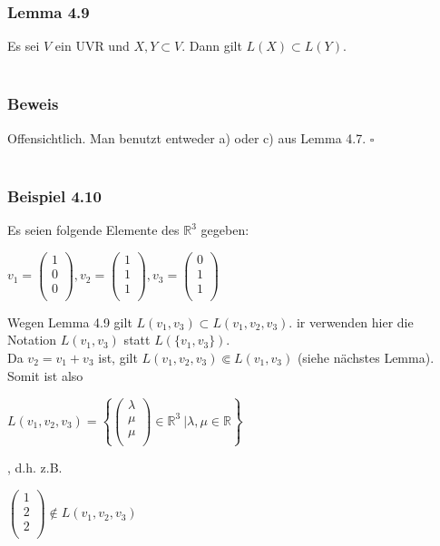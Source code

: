 \documentclass{article}
\begin{document}
\subsubsection*{Lemma 4.9}
Es sei $V$ ein UVR und $X, Y \subset V$. Dann gilt $L(X) \subset L(Y)$.\\
\\
\subsubsection*{Beweis}
Offensichtlich. Man benutzt entweder a) oder c) aus Lemma 4.7. $\square$ \\
\\
\subsubsection*{Beispiel 4.10}
Es seien folgende Elemente des $\mathbb{R}^3$ gegeben: \\
\begin{center}
    $v_1 = \begin{pmatrix}
        1 \\
        0 \\
        0 \\
    \end{pmatrix}, v_2 = \begin{pmatrix}
        1 \\
        1 \\
        1 \\
    \end{pmatrix}, v_3 = \begin{pmatrix}
        0 \\
        1 \\
        1 \\
    \end{pmatrix}$ \\
\end{center}
Wegen Lemma 4.9 gilt $L(v_1, v_3) \subset L(v_1, v_2, v_3)$. ir verwenden hier die Notation $L(v_1, v_3)$ statt $L(\{v_1, v_3\})$. \\
Da $v_2 = v_1 + v_3$ ist, gilt $L(v_1, v_2, v_3) \Subset L(v_1, v_3)$ (siehe nächstes Lemma). \\
Somit ist also \\
\begin{center}
    $L(v_1, v_2, v_3) = \left\{ \begin{pmatrix}
        \lambda \\
        \mu \\
        \mu \\
    \end{pmatrix} \in \mathbb{R}^3 \ | \lambda, \mu \in \mathbb{R}  \right\}$ \\
\end{center}
, d.h. z.B. \\
\begin{center}
    $\begin{pmatrix}
        1 \\
        2 \\
        2 \\
    \end{pmatrix} \notin L(v_1, v_2, v_3)$ \\  
\end{center}
\end{document}
